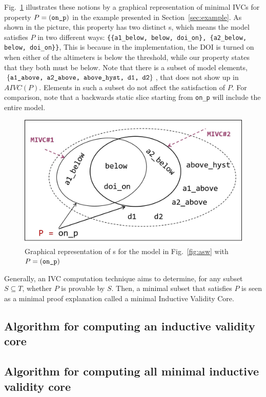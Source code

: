 Fig.~\ref{fig:ivcs} illustrates these notions by a graphical representation of minimal IVCs for property $P = ({\small{\texttt{on\_p}}})$ in the example presented in Section~\ref{sec:example}. As shown in the picture, this property has two distinct \mivc s, which means the model satisfies $P$ in two different ways:  {\small \texttt{\{\{a1\_below, below, doi\_on\}, \{a2\_below, below, doi\_on\}\}}}, This is because in the implementation, the DOI is turned on when either of the altimeters is below the threshold, while our property states that they both must be below.
Note that there is a subset of model elements, $\{{\small \texttt{a1\_above, a2\_above, above\_hyst, d1, d2}}\}$, that does not show up in $AIVC(P)$. Elements in such a subset
do not affect the satisfaction of $P$.  For comparison, note that a backwards static slice starting from {\small{\texttt{on\_p}}} will include the entire model.

\begin{figure}[t]
 \centering
  \includegraphics[width=0.9\columnwidth]{figs/ivcs.jpg}
  \vspace{-0.1in}
  \caption{Graphical representation of \mivc s for the model in Fig.~\ref{fig:asw}
  with  $P = ({\small \texttt{on\_p}})$}
  \label{fig:ivcs}
\end{figure}


Generally, an IVC computation technique aims to determine, for any subset $S \subseteq T$, whether $P$ is provable by $S$. Then, a minimal subset that satisfies $P$ is seen as a minimal proof explanation called a minimal Inductive Validity Core.


\subsection{Algorithm for computing an inductive validity core}




\subsection{Algorithm for computing all minimal inductive validity core}


